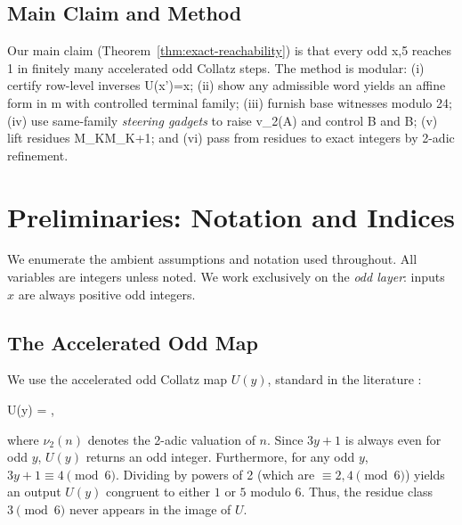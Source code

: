 \documentclass[11pt,letterpaper]{amsart}
\def\({}%
\def\){}%
\def\[{ }%
\def\]{ }%
\theoremstyle{definition}
\theoremstyle{plain}
\theoremstyle{plain}
\theoremstyle{remark}
\begin{document}
\subsection{Main Claim and Method}

Our main claim (Theorem~\ref{thm:exact-reachability}) is that every odd \(x,5\) reaches \(1\) in finitely many accelerated odd Collatz steps. The method is modular:
(i) certify row-level inverses \(U(x')=x\);
(ii) show any admissible word yields an affine form in \(m\) with controlled terminal family;
(iii) furnish base witnesses modulo \(24\);
(iv) use same-family \emph{steering gadgets} to raise \(v_2(A)\) and control \(B\) and \(B\);
(v) lift residues \(M_K\to M_{K+1}\); and
(vi) pass from residues to exact integers by \(2\)-adic refinement.

\section{Preliminaries: Notation and Indices}
\label{sec:preliminaries}

We enumerate the ambient assumptions and notation used throughout. All variables are integers unless noted. We work exclusively on the \emph{odd layer}: inputs $x$ are always positive odd integers.

\subsection{The Accelerated Odd Map}
We use the accelerated odd Collatz map $U(y)$, standard in the literature \cite{Lagarias2010survey}:
\[
U(y) \;=\; ,
\]
where $\nu_2(n)$ denotes the 2-adic valuation of $n$. Since $3y+1$ is always even for odd $y$, $U(y)$ returns an odd integer.
Furthermore, for any odd $y$, $3y+1 \equiv 4 \pmod 6$. Dividing by powers of 2 (which are $\equiv 2, 4 \pmod 6$) yields an output $U(y)$ congruent to either $1$ or $5$ modulo $6$. Thus, the residue class $3 \pmod 6$ never appears in the image of $U$.
\end{document}
